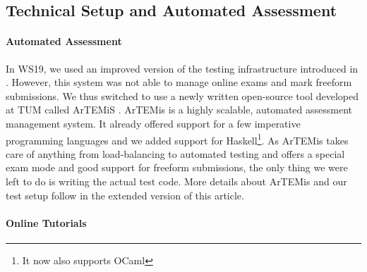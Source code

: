 \subsection{Technical Setup and Automated Assessment}\label{sec:tech_setup_test}

\paragraph{Automated Assessment}
In WS19, we used an improved version of
the testing infrastructure introduced in \citep{next_1100}.
However, this system was not able to manage online exams and mark freeform submissions.
We thus switched to use a newly written open-source
tool developed at TUM called ArTEMiS \citep{artemis}.
ArTEMis is a highly scalable, automated assessment management system.
It already offered support for a few imperative programming languages
and we added support for Haskell\footnote{It now also supports OCaml}.
As ArTEMis takes care of anything from load-balancing to
automated testing and
offers a special exam mode and good support for freeform submissions,
the only thing we were left to do is writing the actual test code.
More details about ArTEMis and our test setup follow
in the extended version of this article.

\paragraph{Online Tutorials}



